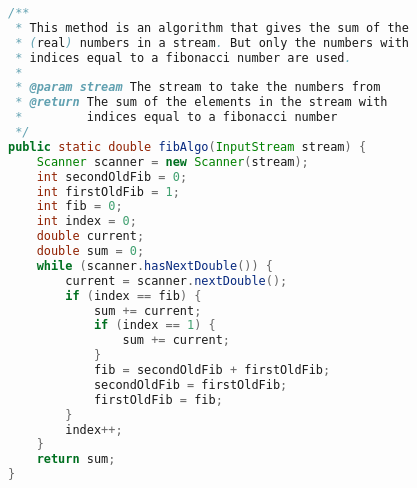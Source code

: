 \documentclass[12pt]{article}
\begin{document}
\begin{lstlisting}[language=java]
/**
 * This method is an algorithm that gives the sum of the
 * (real) numbers in a stream. But only the numbers with
 * indices equal to a fibonacci number are used.
 *
 * @param stream The stream to take the numbers from
 * @return The sum of the elements in the stream with
 *         indices equal to a fibonacci number
 */
public static double fibAlgo(InputStream stream) {
    Scanner scanner = new Scanner(stream);
    int secondOldFib = 0;
    int firstOldFib = 1;
    int fib = 0;
    int index = 0;
    double current;
    double sum = 0;
    while (scanner.hasNextDouble()) {
        current = scanner.nextDouble();
        if (index == fib) {
            sum += current;
            if (index == 1) {
                sum += current;
            }
            fib = secondOldFib + firstOldFib;
            secondOldFib = firstOldFib;
            firstOldFib = fib;
        }
        index++;
    }
    return sum;
}
\end{lstlisting}
\end{document}
